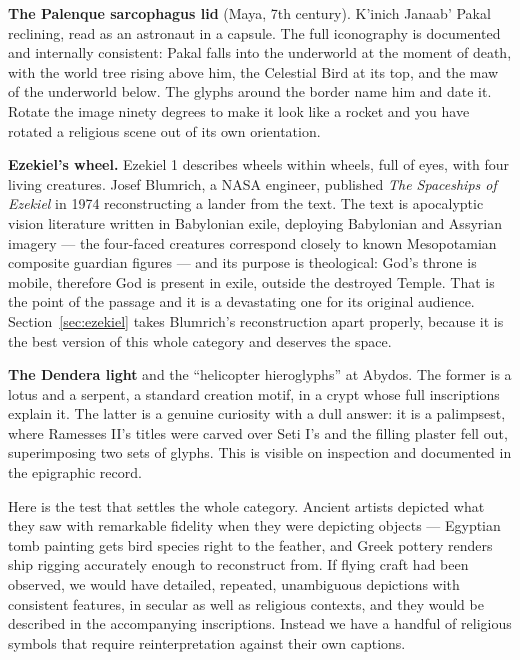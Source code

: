 \textbf{The Palenque sarcophagus lid} (Maya, 7th century). K'inich Janaab' Pakal reclining,
read as an astronaut in a capsule. The full iconography is documented and internally consistent:
Pakal falls into the underworld at the moment of death, with the world tree rising above him,
the Celestial Bird at its top, and the maw of the underworld below. The glyphs around the border
name him and date it. Rotate the image ninety degrees to make it look like a rocket and you have
rotated a religious scene out of its own orientation.

\textbf{Ezekiel's wheel.} Ezekiel 1 describes wheels within wheels, full of eyes, with four
living creatures. Josef Blumrich, a NASA engineer, published \emph{The Spaceships of Ezekiel} in
1974 reconstructing a lander from the text. The text is apocalyptic vision literature written in
Babylonian exile, deploying Babylonian and Assyrian imagery --- the four-faced creatures
correspond closely to known Mesopotamian composite guardian figures --- and its purpose is
theological: God's throne is mobile, therefore God is present in exile, outside the destroyed
Temple. That is the point of the passage and it is a devastating one for its original audience.
Section~\ref{sec:ezekiel} takes Blumrich's reconstruction apart properly, because it is the best
version of this whole category and deserves the space.

\textbf{The Dendera light} and the ``helicopter hieroglyphs'' at Abydos. The former is a lotus
and a serpent, a standard creation motif, in a crypt whose full inscriptions explain it. The
latter is a genuine curiosity with a dull answer: it is a palimpsest, where Ramesses II's titles
were carved over Seti I's and the filling plaster fell out, superimposing two sets of glyphs.
This is visible on inspection and documented in the epigraphic record.

\begin{funfact}
Here is the test that settles the whole category. Ancient artists depicted what they saw with
remarkable fidelity when they were depicting objects --- Egyptian tomb painting gets bird
species right to the feather, and Greek pottery renders ship rigging accurately enough to
reconstruct from. If flying craft had been observed, we would have detailed, repeated,
unambiguous depictions with consistent features, in secular as well as religious contexts, and
they would be described in the accompanying inscriptions. Instead we have a handful of religious
symbols that require reinterpretation against their own captions.
\end{funfact}

